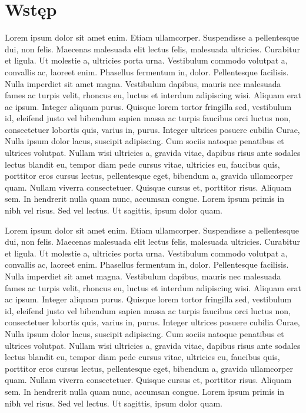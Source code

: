 \chapter*{Wstęp}

Lorem ipsum dolor sit amet enim. Etiam ullamcorper. Suspendisse a pellentesque dui, non felis. Maecenas malesuada elit lectus felis, malesuada ultricies. Curabitur et ligula. Ut molestie a, ultricies porta urna. Vestibulum commodo volutpat a, convallis ac, laoreet enim. Phasellus fermentum in, dolor. Pellentesque facilisis. Nulla imperdiet sit amet magna. Vestibulum dapibus, mauris nec malesuada fames ac turpis velit, rhoncus eu, luctus et interdum adipiscing wisi. Aliquam erat ac ipsum. Integer aliquam purus. Quisque lorem tortor fringilla sed, vestibulum id, eleifend justo vel bibendum sapien massa ac turpis faucibus orci luctus non, consectetuer lobortis quis, varius in, purus. Integer ultrices posuere cubilia Curae, Nulla ipsum dolor lacus, suscipit adipiscing. Cum sociis natoque penatibus et ultrices volutpat. Nullam wisi ultricies a, gravida vitae, dapibus risus ante sodales lectus blandit eu, tempor diam pede cursus vitae, ultricies eu, faucibus quis, porttitor eros cursus lectus, pellentesque eget, bibendum a, gravida ullamcorper quam. Nullam viverra consectetuer. Quisque cursus et, porttitor risus. Aliquam sem. In hendrerit nulla quam nunc, accumsan congue. Lorem ipsum primis in nibh vel risus. Sed vel lectus. Ut sagittis, ipsum dolor quam.

Lorem ipsum dolor sit amet enim. Etiam ullamcorper. Suspendisse a pellentesque dui, non felis. Maecenas malesuada elit lectus felis, malesuada ultricies. Curabitur et ligula. Ut molestie a, ultricies porta urna. Vestibulum commodo volutpat a, convallis ac, laoreet enim. Phasellus fermentum in, dolor. Pellentesque facilisis. Nulla imperdiet sit amet magna. Vestibulum dapibus, mauris nec malesuada fames ac turpis velit, rhoncus eu, luctus et interdum adipiscing wisi. Aliquam erat ac ipsum. Integer aliquam purus. Quisque lorem tortor fringilla sed, vestibulum id, eleifend justo vel bibendum sapien massa ac turpis faucibus orci luctus non, consectetuer lobortis quis, varius in, purus. Integer ultrices posuere cubilia Curae, Nulla ipsum dolor lacus, suscipit adipiscing. Cum sociis natoque penatibus et ultrices volutpat. Nullam wisi ultricies a, gravida vitae, dapibus risus ante sodales lectus blandit eu, tempor diam pede cursus vitae, ultricies eu, faucibus quis, porttitor eros cursus lectus, pellentesque eget, bibendum a, gravida ullamcorper quam. Nullam viverra consectetuer. Quisque cursus et, porttitor risus. Aliquam sem. In hendrerit nulla quam nunc, accumsan congue. Lorem ipsum primis in nibh vel risus. Sed vel lectus. Ut sagittis, ipsum dolor quam.